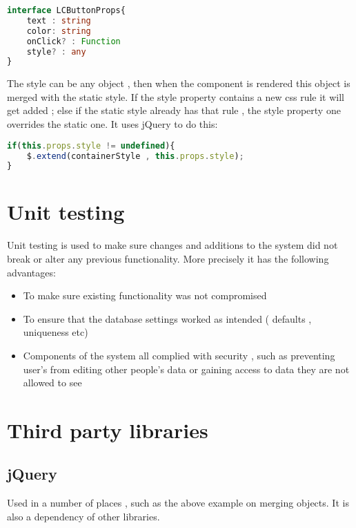 \begin{lstlisting}[breaklines,language=Typescript,frame=single,basicstyle=\ttfamily,
    stringstyle=\color{red},
    keywordstyle=\color{blue}]
interface LCButtonProps{
    text : string
    color: string
    onClick? : Function
    style? : any
}
\end{lstlisting}

The style can be any object , then when the component is rendered this object is merged with the static style. If the style property contains a new css rule it will get added ; else if the static style already has that rule , the style property one overrides the static one. It uses jQuery to do this:

\begin{lstlisting}[breaklines,language=Typescript,frame=single,basicstyle=\ttfamily,
    stringstyle=\color{red},
    keywordstyle=\color{blue}]
if(this.props.style != undefined){
	$.extend(containerStyle , this.props.style);    
}
\end{lstlisting}

\section{Unit testing}
Unit testing is used to make sure changes and additions to the system did not break or alter any previous functionality. More precisely it has the following advantages:
\begin{itemize}
	\item To make sure existing functionality was not compromised
	\item To ensure that the database settings worked as intended ( defaults , uniqueness etc)
	\item Components of the system all complied with security , such as preventing user's from editing other people's data or gaining access to data they are not allowed to see
\end{itemize}




\section{Third party libraries} \label{libs}

\subsection{jQuery}
Used in a number of places , such as the above example on merging objects. It is also a dependency of other libraries.

